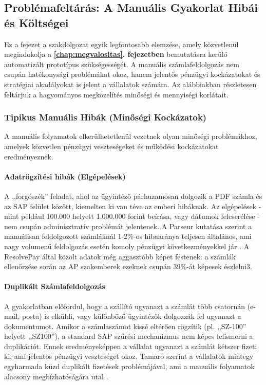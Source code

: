\subsection{Problémafeltárás: A Manuális Gyakorlat Hibái és Költségei} \label{sec:problemfeltaras_hibai_koltsegei}

Ez a fejezet a szakdolgozat egyik legfontosabb elemzése, amely közvetlenül megindokolja a \textbf{\ref{chap:megvalositas}. fejezetben} bemutatásra kerülő automatizált prototípus szükségességét. A manuális számlafeldolgozás nem csupán hatékonysági problémákat okoz, hanem jelentős pénzügyi kockázatokat és stratégiai akadályokat is jelent a vállalatok számára.
Az alábbiakban részletesen feltárjuk a hagyományos megközelítés minőségi és mennyiségi korlátait.


\subsubsection{Tipikus Manuális Hibák (Minőségi Kockázatok)}

A manuális folyamatok elkerülhetetlenül vezetnek olyan minőségi problémákhoz, amelyek közvetlen pénzügyi veszteségeket és működési kockázatokat eredményeznek.

\paragraph{Adatrögzítési hibák (Elgépelések)}
A ,,forgószék'' feladat, ahol az ügyintéző párhuzamosan dolgozik a PDF számla és az SAP felület között, kiemelten ki van téve az emberi hibáknak.
Az elgépelések - mint például 100.000 helyett 1.000.000 forint beírása, vagy dátumok felcserélése - nem csupán adminisztratív problémát jelentenek.
A Parseur kutatása szerint a manuálisan feldolgozott számláknál 1-2\%-os hibaaránya teljesen általános, ami nagy volumenű feldolgozás esetén komoly pénzügyi következményekkel jár \cite{Parseur-AI-Invoice-Processing}.
A ResolvePay által közölt adatok még aggasztóbb képet festenek: a számlák ellenőrzése során az AP szakemberek ezeknek csupán 39\%-át képesek észlelni3\cite{Resolvepay-17-Statistics-Showing}.

\paragraph{Duplikált Számlafeldolgozás}
A gyakorlatban előfordul, hogy a szállító ugyanazt a számlát több csatornán (e-mail, posta) is elküldi, vagy különböző ügyintézők dolgozzák fel ugyanazt a dokumentumot.
Amikor a számlaszámot kissé eltérően rögzítik (pl. ,,SZ-100'' helyett ,,SZ100''), a standard SAP szűrési mechanizmus nem képes felismerni a duplikációt.
Ennek eredményeképpen a vállalat ugyanazt a számlát kétszer fizeti ki, ami jelentős pénzügyi veszteséget okoz.
Tamaro szerint a vállalatok mintegy egyharmada küzd duplikált fizetések problémájával, ami a manuális folyamatok alacsony megbízhatóságára utal \cite{Caso-Hidden-Costs-of-Manual}.

